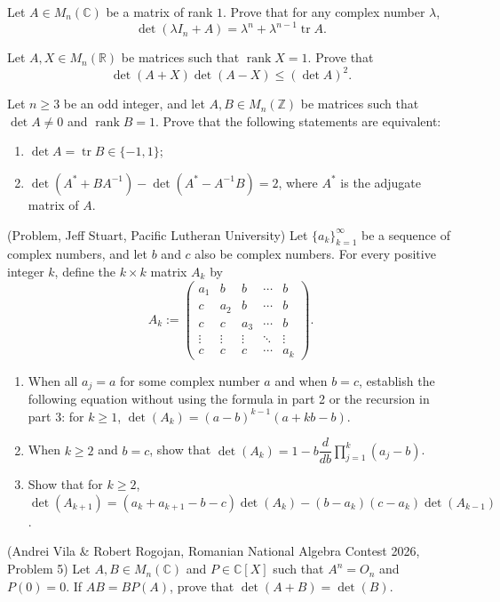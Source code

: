 \documentclass[12pt]{article}
\begin{document}
\begin{problems}
\item Let $A\in M_n(\mathbb{C})$ be a matrix of rank $1$. Prove that for any complex number $\lambda$,
\[
\det(\lambda I_n+A) = \lambda^n + \lambda^{n-1}\operatorname{tr}A.
\]

\item Let $A,X\in M_n(\mathbb{R})$ be matrices such that $\operatorname{rank}X=1$. Prove that
\[
\det(A+X)\det(A-X) \le (\det A)^2.
\]

\item Let $n\ge 3$ be an odd integer, and let $A,B\in M_n(\mathbb{Z})$ be matrices such that $\det A\ne 0$ and $\operatorname{rank}B=1$. Prove that the following statements are equivalent:
\begin{enumerate}[label=(\roman*)]
\item $\det A = \operatorname{tr}B \in \{-1,1\}$;
\item $\det(A^*+BA^{-1}) - \det(A^*-A^{-1}B) = 2$, where $A^*$ is the adjugate matrix of $A$.
\end{enumerate}

\item (Problem, Jeff Stuart, Pacific Lutheran University) Let $\{a_k\}_{k=1}^\infty$ be a sequence of complex numbers, and let $b$ and $c$ also be complex numbers. For every positive integer $k$, define the $k\times k$ matrix $A_k$ by
\[
A_k := \begin{pmatrix}
a_1 & b & b & \cdots & b\\
c & a_2 & b & \cdots & b\\
c & c & a_3 & \cdots & b\\
\vdots & \vdots & \vdots & \ddots & \vdots\\
c & c & c & \cdots & a_k
\end{pmatrix}.
\]
\begin{enumerate}[label=\arabic*.]
\item When all $a_j=a$ for some complex number $a$ and when $b=c$, establish the following equation without using the formula in part 2 or the recursion in part 3: for $k\ge 1$, $\det(A_k) = (a-b)^{k-1}(a+kb-b)$.
\item When $k\ge 2$ and $b=c$, show that $\det(A_k) = 1 - b\dfrac{d}{db}\displaystyle\prod_{j=1}^k (a_j-b)$.
\item Show that for $k\ge 2$, $\det(A_{k+1}) = (a_k+a_{k+1}-b-c)\det(A_k) - (b-a_k)(c-a_k)\det(A_{k-1})$.
\end{enumerate}

\item (Andrei Vila \& Robert Rogojan, Romanian National Algebra Contest 2026, Problem 5) Let $A,B\in M_n(\mathbb{C})$ and $P\in\mathbb{C}[X]$ such that $A^n=O_n$ and $P(0)=0$. If $AB=BP(A)$, prove that $\det(A+B)=\det(B)$.


\end{problems}
\end{document}
